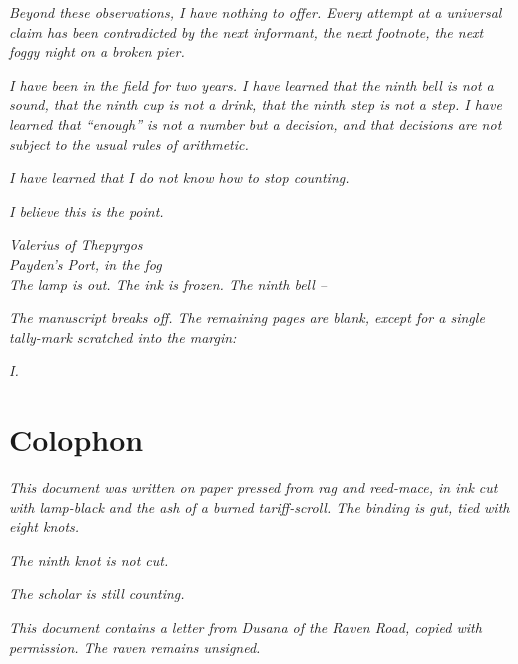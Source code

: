\documentclass[12pt]{article}
\begin{document}
\textit{Beyond these observations, I have nothing to offer. Every attempt at a universal claim has been contradicted by the next informant, the next footnote, the next foggy night on a broken pier.}

\textit{I have been in the field for two years. I have learned that the ninth bell is not a sound, that the ninth cup is not a drink, that the ninth step is not a step. I have learned that ``enough'' is not a number but a decision, and that decisions are not subject to the usual rules of arithmetic.}

\textit{I have learned that I do not know how to stop counting.}

\textit{I believe this is the point.}

\textit{Valerius of Thepyrgos}\\
\textit{Payden's Port, in the fog}\\
\textit{The lamp is out. The ink is frozen. The ninth bell --}

\textit{The manuscript breaks off. The remaining pages are blank, except for a single tally-mark scratched into the margin:}

\textit{I.}

\section*{Colophon}
\textit{This document was written on paper pressed from rag and reed-mace, in ink cut with lamp-black and the ash of a burned tariff-scroll. The binding is gut, tied with eight knots.}

\textit{The ninth knot is not cut.}

\textit{The scholar is still counting.}

\textit{This document contains a letter from Dusana of the Raven Road, copied with permission. The raven remains unsigned.}
\end{document}
